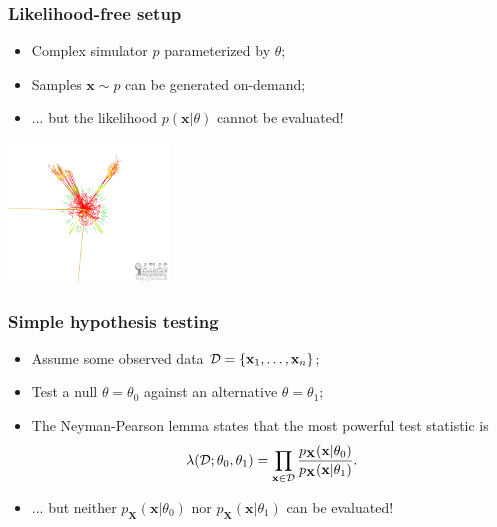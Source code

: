 \documentclass{beamer}
\begin{document}
\begin{frame}
    \frametitle{Likelihood-free setup}

    \begin{itemize}
        \item Complex simulator $p$ parameterized by $\theta$;
        \item Samples $\mathbf{x} \sim p$ can be generated on-demand;
        \item ... but the likelihood $p(\mathbf{x}|\theta)$ cannot be evaluated!
    \end{itemize}

    \centering
    \includegraphics[height=10em]{figures/sim-boson.jpg}

\end{frame}

\begin{frame}
    \frametitle{Simple hypothesis testing}

    \begin{itemize}
        \item Assume some observed data ${\cal D} = \{ \mathbf{x}_1, \dots, \mathbf{x}_n \}$;
        \item Test a null $\theta = \theta_0$ against an alternative $\theta = \theta_1$;
        \item The Neyman-Pearson lemma states that the most powerful test statistic is
            $$
            \lambda({\cal D}; \theta_0, \theta_1) = \prod_{\mathbf{x} \in {\cal D}} \frac{ p_\mathbf{X}(\mathbf{x}|\theta_0)}{ p_\mathbf{X}(\mathbf{x}|\theta_1)}.
            $$
        \item ... but neither $p_\mathbf{X}(\mathbf{x}|\theta_0)$ nor $p_\mathbf{X}(\mathbf{x}|\theta_1)$ can be evaluated!

    \end{itemize}

\end{frame}
\end{document}
